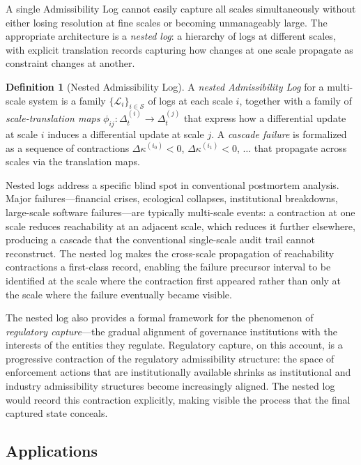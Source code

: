 \documentclass[12pt, a4paper]{article}
\theoremstyle{plain}
\theoremstyle{definition}
\newtheorem{definition}[theorem]{Definition}
\theoremstyle{remark}
\begin{document}
A single Admissibility Log cannot easily capture all scales simultaneously
without either losing resolution at fine scales or becoming unmanageably
large. The appropriate architecture is a \emph{nested log}: a hierarchy of
logs at different scales, with explicit translation records capturing how
changes at one scale propagate as constraint changes at another.

\begin{definition}[Nested Admissibility Log]
A \emph{nested Admissibility Log} for a multi-scale system is a family
$\{\mathcal{L}_i\}_{i \in \mathcal{S}}$ of logs at each scale $i$, together
with a family of \emph{scale-translation maps} $\phi_{ij}: \Delta_t^{(i)}
\to \Delta_t^{(j)}$ that express how a differential update at scale $i$
induces a differential update at scale $j$. A \emph{cascade failure} is
formalized as a sequence of contractions $\Delta\kappa^{(i_0)} < 0$,
$\Delta\kappa^{(i_1)} < 0$, $\ldots$ that propagate across scales via the
translation maps.
\end{definition}

Nested logs address a specific blind spot in conventional postmortem analysis.
Major failures---financial crises, ecological collapses, institutional
breakdowns, large-scale software failures---are typically multi-scale events:
a contraction at one scale reduces reachability at an adjacent scale, which
reduces it further elsewhere, producing a cascade that the conventional
single-scale audit trail cannot reconstruct. The nested log makes the
cross-scale propagation of reachability contractions a first-class record,
enabling the failure precursor interval to be identified at the scale where
the contraction first appeared rather than only at the scale where the failure
eventually became visible.

The nested log also provides a formal framework for the phenomenon of
\emph{regulatory capture}---the gradual alignment of governance institutions
with the interests of the entities they regulate. Regulatory capture, on this
account, is a progressive contraction of the regulatory admissibility structure:
the space of enforcement actions that are institutionally available shrinks
as institutional and industry admissibility structures become increasingly
aligned. The nested log would record this contraction explicitly, making visible
the process that the final captured state conceals.

\subsection{Applications}
\end{document}
